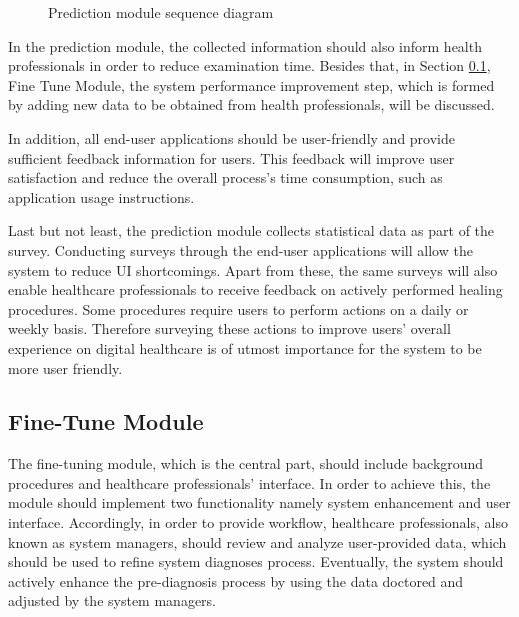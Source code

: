 \begin{figure}[htbp]
\centering
{}
\caption{Prediction module sequence diagram}
\label{fig:PredictionModuleSequenceDiagram}
\end{figure}

In the prediction module, the collected information should also inform health professionals in order to reduce examination time. Besides that, in Section \ref{sec:FineTuneModule}, Fine Tune Module, the system performance improvement step, which is formed by adding new data to be obtained from health professionals, will be discussed.

In addition, all end-user applications should be user-friendly and provide sufficient feedback information for users. This feedback will improve user satisfaction and reduce the overall process's time consumption, such as application usage instructions.

Last but not least, the prediction module collects statistical data as part of the survey. Conducting surveys through the end-user applications will allow the system to reduce UI shortcomings. Apart from these, the same surveys will also enable healthcare professionals to receive feedback on actively performed healing procedures. Some procedures require users to perform actions on a daily or weekly basis. Therefore surveying these actions to improve users' overall experience on digital healthcare is of utmost importance for the system to be more user friendly.

\subsection{ Fine-Tune Module }\label{sec:FineTuneModule}

The fine-tuning module, which is the central part, should include background procedures and healthcare professionals' interface. In order to achieve this, the module should implement two functionality namely system enhancement and user interface. Accordingly, in order to provide workflow, healthcare professionals, also known as system managers, should review and analyze user-provided data, which should be used to refine system diagnoses process. Eventually, the system should actively enhance the pre-diagnosis process by using the data doctored and adjusted by the system managers.

